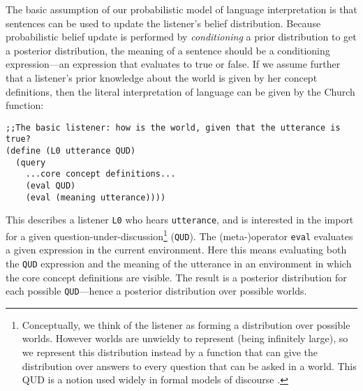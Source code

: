 \documentclass[12pt]{article}
\newcounter{definition}
\begin{document}
The basic assumption of our probabilistic model of language interpretation is that sentences can be used to update the listener's belief distribution. Because probabilistic belief update is performed by \emph{conditioning} a prior distribution to get a posterior distribution, the meaning of a sentence should be a conditioning expression---an expression that evaluates to true or false.
If we assume further that a listener's prior knowledge about the world is given by her concept definitions, then the literal interpretation of language can be given by the Church function: 
\pagebreak
\begin{lstlisting}
;;The basic listener: how is the world, given that the utterance is true?
(define (L0 utterance QUD)
  (query
    ...core concept definitions...
    (eval QUD)
    (eval (meaning utterance))))
\end{lstlisting}
This describes a listener \lstinline{L0} who hears \lstinline{utterance}, and is interested in the import for a given question-under-discussion\footnote{Conceptually, we think of the listener as forming a distribution over possible worlds. However worlds are unwieldy to represent (being infinitely large), so we represent this distribution instead by a function that can give the distribution over answers to every question that can be asked in a world. This QUD is a notion used widely in formal models of discourse \cite{kuppevelt95,ginzburg95a,ginzburg95b,roberts96,roberts04,beaverclark08}.} 
(\lstinline{QUD}).
The (meta-)operator \lstinline{eval} evaluates a given expression in the current environment. Here this means evaluating both the \lstinline{QUD} expression and the meaning of the utterance in an environment in which the core concept definitions are visible.
The result is a posterior distribution for each possible \lstinline{QUD}---hence a posterior distribution over possible worlds.
 
\end{document}
